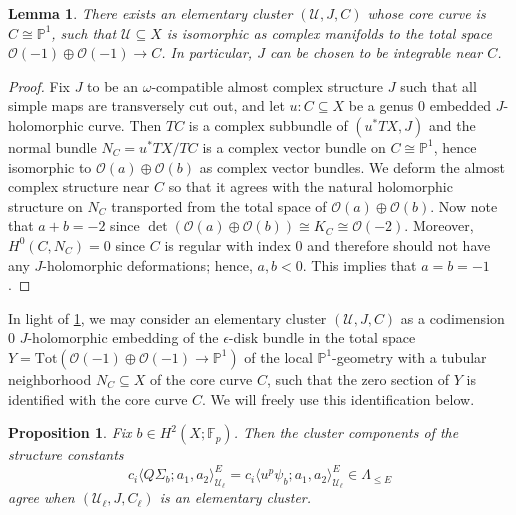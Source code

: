 \documentclass[reqno]{amsart}
\numberwithin{equation}{section}
\numberwithin{equation}{section}
\numberwithin{equation}{section}
\newtheorem{prop}[thm]{Proposition}
\newtheorem{lemma}[thm]{Lemma}
\theoremstyle{definition}
\theoremstyle{remark}
\theoremstyle{remark}
\begin{document}
\begin{lemma}\label{lem:elementary-cluster-existence}
    There exists an elementary cluster $(\mathcal{U}, J, C)$ whose core curve is $C \cong \mathbb{P}^1$, such that $\mathcal{U} \subseteq X$ is isomorphic as complex manifolds to the total space $\mathcal{O}(-1) \oplus \mathcal{O}(-1) \to C$. In particular, $J$ can be chosen to be integrable near $C$.
\end{lemma}
\begin{proof}
    Fix $J$ to be an $\omega$-compatible almost complex structure $J$ such that all simple maps are transversely cut out, and let $u: C \subseteq X$ be a genus $0$ embedded $J$-holomorphic curve. Then $TC$ is a complex subbundle of $(u^*TX, J)$ and the normal bundle $N_C = u^*TX/TC$ is a complex vector bundle on $C \cong \mathbb{P}^1$, hence isomorphic to $\mathcal{O}(a) \oplus \mathcal{O}(b)$ as complex vector bundles. We deform the almost complex structure near $C$ so that it agrees with the natural holomorphic structure on $N_C$ transported from the total space of $\mathcal{O}(a) \oplus \mathcal{O}(b)$. Now note that $a+b = -2$ since $\det(\mathcal{O}(a) \oplus \mathcal{O}(b)) \cong K_C \cong \mathcal{O}(-2)$. Moreover, $H^0(C, N_C) = 0$ since $C$ is regular with index $0$ and therefore should not have any $J$-holomorphic deformations; hence, $a, b < 0$. This implies that $a=b=-1$.
\end{proof}

In light of \cref{lem:elementary-cluster-existence}, we may consider an elementary cluster $(\mathcal{U}, J, C)$ as a codimension $0$ $J$-holomorphic embedding of the $\epsilon$-disk bundle in the total space $Y = \mathrm{Tot}(\mathcal{O}(-1) \oplus \mathcal{O}(-1) \to \mathbb{P}^1)$ of the local $\mathbb{P}^1$-geometry with a tubular neighborhood $N_C \subseteq X$ of the core curve $C$, such that the zero section of $Y$ is identified with the core curve $C$. We will freely use this identification below.

\begin{prop}\label{prop:elementary-cluster-qst-is-pcurv}
    Fix $b \in H^2(X;\mathbb{F}_p)$. Then the cluster components of the structure constants
    \begin{equation}
         c_i \langle Q\Sigma_b ; a_1, a_2 \rangle^E_{\mathcal{U}_\ell} = c_i \langle u^p \psi_b ; a_1, a_2 \rangle^E_{\mathcal{U}_\ell} \in \Lambda_{\le E}
    \end{equation}
    agree when $(\mathcal{U}_\ell, J, C_\ell)$ is an elementary cluster.
\end{prop}
\end{document}
